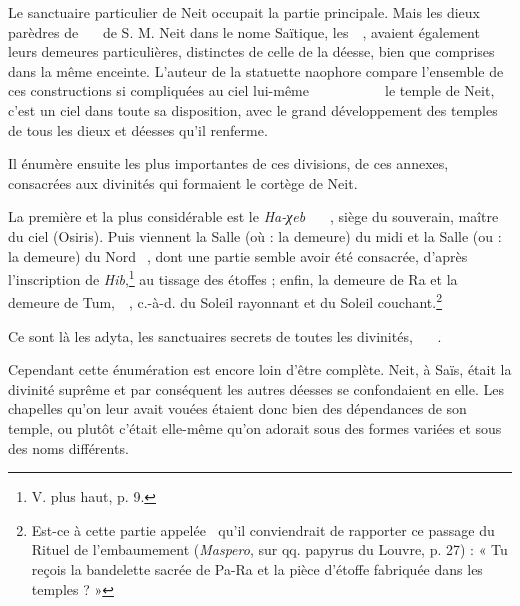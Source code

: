 \documentclass[letterpaper,twocolumn,openany,nodeprecatedcode]{dndbook}
\newcommand*\hieroAAAH{}
\newcommand*\hieroAAAO{}
\newcommand*\hieroAAAU{}
\newcommand*\hieroAAAX{}
\newcommand*\hieroAABC{\raisebox{0.5ex}{}}
\newcommand*\hieroAABR{}
\newcommand*\hieroAACN{\raisebox{1ex}{}}
\newcommand*\hieroAACS{}
\newcommand*\hieroAADB{}
\newcommand*\hieroAAEK{}
\newcommand*\hieroAAEZ{}
\newcommand*\hieroAAFW{}
\newcommand*\hieroAAHA{}
\newcommand*\hieroAAHC{}
\newcommand*\hieroAAHK{}
\newcommand*\hieroAAHN{}
\newcommand*\hieroAAHO{}
\newcommand*\hieroAAHP{}
\newcommand*\hieroAAHQ{}
\newcommand*\hieroAAHR{}
\newcommand*\hieroAAHS{}
\newcommand*\hieroAAHT{}
\newcommand*\hieroAAHU{}
\newcommand*\hieroAAHV{}
\newcommand*\hieroAAHW{}
\newcommand*\hieroAAHX{}
\newcommand*\hieroAAHY{}
\newcommand*\hieroAAHZ{}
\newcommand*\hieroAAIA{\raisebox{0.3ex}{}}
\newcommand*\hieroAAIB{}
\newcommand*\hieroAAIC{}
\newcommand*\hieroAAID{}
\newcommand*\hieroAAIE{}
\newcommand*\hieroAAIF{}
\newcommand*\hieroAAIG{}
\newcommand*\hieroAAIH{}
\begin{document}
Le sanctuaire particulier de Neit occupait la partie principale. Mais les dieux parèdres de $\hieroAAHC\:\hieroAACS\:\hieroAADB\allowbreak\:\hieroAAAO\:\hieroAAHO\:\hieroAAHP$ de S. M. Neit dans le nome Saïtique, les $\hieroAAEK\:\hieroAAEK\:\hieroAAEK\:\hieroAAHP$, avaient également leurs demeures particulières, distinctes de celle de la déesse, bien que comprises dans la même enceinte. L'auteur de la statuette naophore compare l'ensemble de ces constructions si compliquées au ciel lui-même $\hieroAAAO\:\hieroAAHK\:\hieroAAHQ\allowbreak\:\hieroAABR\:\hieroAACS\:\hieroAAHR\allowbreak\:\hieroAAHS\:\hieroAAEZ\:\hieroAAHT\allowbreak\:\hieroAACS\:\hieroAAHR\:\hieroAAHU\allowbreak\:\hieroAAAO\:\hieroAAHA\:\hieroAAEK\allowbreak\:\hieroAAEK\:\hieroAAEK\:\hieroAAHV\:\hieroAABC\allowbreak\:\hieroAAAH\:\hieroAAHW\:\hieroAAHX$ le temple de Neit, c'est un ciel dans toute sa disposition, avec le grand développement des temples de tous les dieux et déesses qu'il renferme.

Il énumère ensuite les plus importantes de ces divisions, de ces annexes, consacrées aux divinités qui formaient le cortège de Neit.

La première et la plus considérable est le \emph{Ha-χeb} $\hieroAAFW\:\hieroAAHY\:\hieroAAAU\allowbreak\:\hieroAAHZ\:\hieroAAIA\allowbreak\:\hieroAAIB\:\hieroAAIC$, siège du souverain, maître du ciel (Osiris). Puis viennent la Salle (où : la demeure) du midi et la Salle (ou : la demeure) du Nord $\hieroAAAX\:\hieroAAID\:\hieroAAIE$, dont une partie semble avoir été consacrée, d'après l'inscription de \emph{Hib},\footnote{V. plus haut, p. 9.} au tissage des étoffes ; enfin, la demeure de Ra et la demeure de Tum, $\hieroAAHN\:\hieroAAIF\:\hieroAAHN\:\hieroAAIG$, c.-à-d. du Soleil rayonnant et du Soleil couchant.\footnote{Est-ce à cette partie appelée $\hieroAAHN\:\hieroAAIF$ qu'il conviendrait de rapporter ce passage du Rituel de l'embaumement (\emph{Maspero}, sur qq. papyrus du Louvre, p. 27) : « Tu reçois la bandelette sacrée de Pa-Ra et la pièce d'étoffe fabriquée dans les temples ? »}

Ce sont là les adyta, les sanctuaires secrets de toutes les divinités, $\hieroAAIH\:\hieroAAHZ\:\hieroAACN\allowbreak\:\hieroAAEK\:\hieroAAEK\allowbreak\:\hieroAAEK\:\hieroAABC$.

Cependant cette énumération est encore loin d'être complète. Neit, à Saïs, était la divinité suprême et par conséquent les autres déesses se confondaient en elle. Les chapelles qu'on leur avait vouées étaient donc bien des dépendances de son temple, ou plutôt c'était elle-même qu'on adorait sous des formes variées et sous des noms différents.
\end{document}
